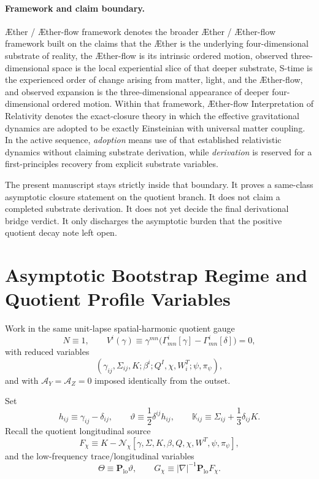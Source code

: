 \documentclass[11pt]{article}
\newcommand{\Aether}{\AE{}ther}
\newcommand{\Aflow}{\AE{}ther-flow}
\newcommand{\TheoryName}{\Aflow{} Interpretation of Relativity}
\newcommand{\TheoryProgram}{\Aether{} / \Aflow{} framework}
\newcommand{\AY}{\mathcal A_Y}
\newcommand{\AZ}{\mathcal A_Z}
\begin{document}
\paragraph{Framework and claim boundary.}
\TheoryProgram{} denotes the broader \Aether{} / \Aflow{} framework built on the claims that the \Aether{} is the underlying four-dimensional substrate of reality, the \Aflow{} is its intrinsic ordered motion, observed three-dimensional space is the local experiential slice of that deeper substrate, S-time is the experienced order of change arising from matter, light, and the \Aflow{}, and observed expansion is the three-dimensional appearance of deeper four-dimensional ordered motion. Within that framework, \TheoryName{} denotes the exact-closure theory in which the effective gravitational dynamics are adopted to be exactly Einsteinian with universal matter coupling. In the active sequence, \emph{adoption} means use of that established relativistic dynamics without claiming substrate derivation, while \emph{derivation} is reserved for a first-principles recovery from explicit substrate variables.

The present manuscript stays strictly inside that boundary. It proves a same-class asymptotic closure statement on the quotient branch. It does not claim a completed substrate derivation. It does not yet decide the final derivational bridge verdict. It only discharges the asymptotic burden that the positive quotient decay note left open.

\section{Asymptotic Bootstrap Regime and Quotient Profile Variables}

Work in the same unit-lapse spatial-harmonic quotient gauge
\begin{equation}
N\equiv 1,
\qquad
V^i(\gamma)\equiv \gamma^{mn}\bigl(\Gamma^i_{mn}[\gamma]-\Gamma^i_{mn}[\delta]\bigr)=0,
\label{eq:gauge}
\end{equation}
with reduced variables
\begin{equation}
(\gamma_{ij},\Sigma_{ij},K;\beta^i;Q^I,\chi,W_i^T;\psi,\pi_\psi),
\label{eq:unknowns}
\end{equation}
and with \(\AY=\AZ=0\) imposed identically from the outset.

Set
\begin{equation}
h_{ij}\equiv \gamma_{ij}-\delta_{ij},
\qquad
\vartheta\equiv \frac12\delta^{ij}h_{ij},
\qquad
\mathbb K_{ij}\equiv \Sigma_{ij}+\frac13\delta_{ij}K.
\label{eq:basicdefs}
\end{equation}
Recall the quotient longitudinal source
\begin{equation}
F_\chi
\equiv
K-\mathcal N_\chi[\gamma,\Sigma,K,\beta,Q,\chi,W^T,\psi,\pi_\psi],
\label{eq:Fchi}
\end{equation}
and the low-frequency trace/longitudinal variables
\begin{equation}
\Theta\equiv \mathbf P_{\mathrm{lo}}\vartheta,
\qquad
G_\chi\equiv |\nabla|^{-1}\mathbf P_{\mathrm{lo}}F_\chi.
\label{eq:ThetaG}
\end{equation}
\end{document}
